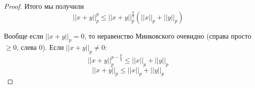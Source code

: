 \documentclass[../main.tex]{subfiles}
\begin{document}
\begin{proof}
    Итого мы получили
    \[ \left| \left| x+y\right|\right|_p^p \leq \left| \left| x+y\right|\right|_p^ \frac{ p}{ q} \left( \left| \left| x\right|\right|_p+\left| \left| y\right|\right|_p\right)\]

    Вообще если \( \left| \left| x+y\right|\right|_p=0\), то неравенство Минковского очевидно (справа просто \( \geq 0\), слева 0). Если \( \left| \left| x+y\right|\right|_p \neq 0\):
    \[ \left| \left| x+y\right|\right|_p^{p- \frac{ p}{ q} } \leq \left| \left| x\right|\right|_p + \left| \left| y\right|\right|_p\]
    \[ \left| \left| x+y\right|\right|_p \leq \left| \left| x\right|\right|_p + \left| \left| y\right|\right|_p\]
\end{proof}
\end{document}
